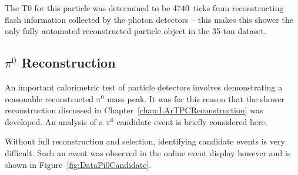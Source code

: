 The T0 for this particle was determined to be 4740~ticks from reconstructing flash information collected by the photon detectors -- this makes this shower the only fully automated reconstructed particle object in the 35-ton dataset.

\subsection{$\pi^0$ Reconstruction}\label{sec:DataPi0Reconstruction}

An important calorimetric test of particle detectors involves demonstrating a reasonable reconstructed $\pi^0$ mass peak.  It was for this reason that the shower reconstruction discussed in Chapter~\ref{chap:LArTPCReconstruction} was developed.  An analysis of a $\pi^0$ candidate event is briefly considered here.

Without full reconstruction and selection, identifying candidate events is very difficult.  Such an event was observed in the online event display however and is shown in Figure~\ref{fig:DataPi0Candidate}.

